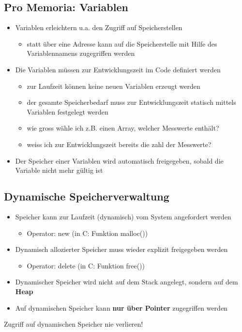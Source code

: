 \subsection{Pro Memoria: Variablen}
\label{sec:Pro Memoria: Variablen}
\begin{itemize}
	\item Variablen erleichtern u.a. den Zugriff auf Speicherstellen
	\begin{itemize}
		\item statt über eine Adresse kann auf die Speicherstelle mit Hilfe des Variablennamens zugegriffen werden
	\end{itemize}
	\item Die Variablen müssen zur Entwicklungszeit im Code definiert werden
	\begin{itemize}
		\item zur Laufzeit können keine neuen Variablen erzeugt werden
		\item der gesamte Speicherbedarf muss zur Entwicklungszeit statisch mittels Variablen festgelegt werden
		\item wie gross wähle ich z.B. einen Array, welcher Messwerte enthält?
		\item weiss ich zur Entwicklungszeit bereits die zahl der Messwerte?
	\end{itemize}
	\item Der Speicher einer Variablen wird automatisch freigegeben, sobald die Variable nicht mehr gültig ist
\end{itemize}

\subsection{Dynamische Speicherverwaltung}
\label{sec:Dynamische Speicherverwaltung 2}
\begin{itemize}
	\item Speicher kann zur Laufzeit (dynamisch) vom System angefordert werden
	\begin{itemize}
		\item Operator: new (in C: Funktion malloc())
	\end{itemize}
	\item Dynamisch allozierter Speicher muss wieder explizit freigegeben werden
	\begin{itemize}
		\item Operator: delete (in C: Funktion free())
	\end{itemize}
	\item Dynamischer Speicher wird nicht auf dem Stack angelegt, sondern auf dem \textbf{Heap}
	\item Auf dynamischen Speicher kann \textbf{nur über Pointer} zugegriffen werden
\end{itemize}
\begin{achtung}
Zugriff auf dynamischen Speicher nie verlieren!
\end{achtung}

